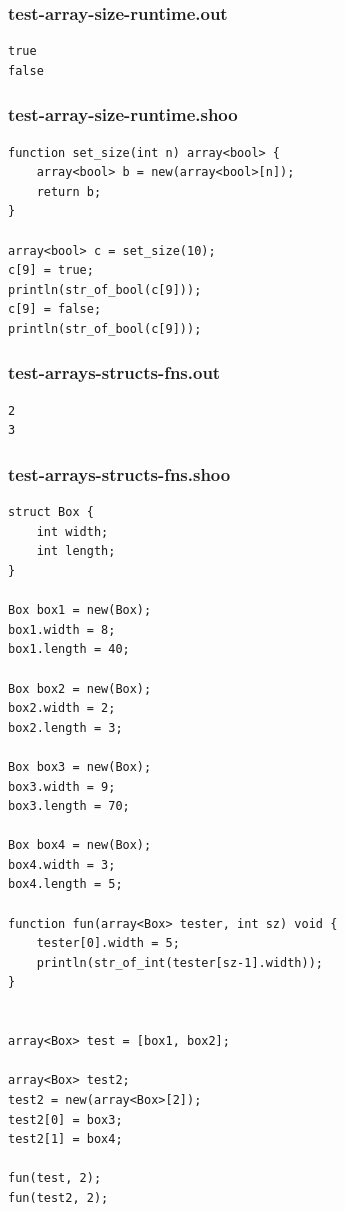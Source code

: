 \documentclass[12pt]{article}
\begin{document}
\subsubsection{test-array-size-runtime.out}
\begin{mdframed}[hidealllines=true,backgroundcolor=green!10]
\begin{lstlisting}
true
false
\end{lstlisting}
\end{mdframed}
\subsubsection{test-array-size-runtime.shoo}
\begin{mdframed}[hidealllines=true,backgroundcolor=blue!10]
\begin{lstlisting}
function set_size(int n) array<bool> {
    array<bool> b = new(array<bool>[n]);
    return b;
}

array<bool> c = set_size(10);
c[9] = true;
println(str_of_bool(c[9]));
c[9] = false;
println(str_of_bool(c[9]));
\end{lstlisting}
\end{mdframed}
\subsubsection{test-arrays-structs-fns.out}
\begin{mdframed}[hidealllines=true,backgroundcolor=green!10]
\begin{lstlisting}
2
3
\end{lstlisting}
\end{mdframed}
\subsubsection{test-arrays-structs-fns.shoo}
\begin{mdframed}[hidealllines=true,backgroundcolor=blue!10]
\begin{lstlisting}
struct Box {
	int width;
	int length;
}

Box box1 = new(Box);
box1.width = 8;
box1.length = 40;

Box box2 = new(Box);
box2.width = 2;
box2.length = 3;

Box box3 = new(Box);
box3.width = 9;
box3.length = 70;

Box box4 = new(Box);
box4.width = 3;
box4.length = 5;

function fun(array<Box> tester, int sz) void {
	tester[0].width = 5;
	println(str_of_int(tester[sz-1].width));
}


array<Box> test = [box1, box2];

array<Box> test2;
test2 = new(array<Box>[2]);
test2[0] = box3;
test2[1] = box4;

fun(test, 2);
fun(test2, 2);\end{lstlisting}
\end{mdframed}
\end{document}
